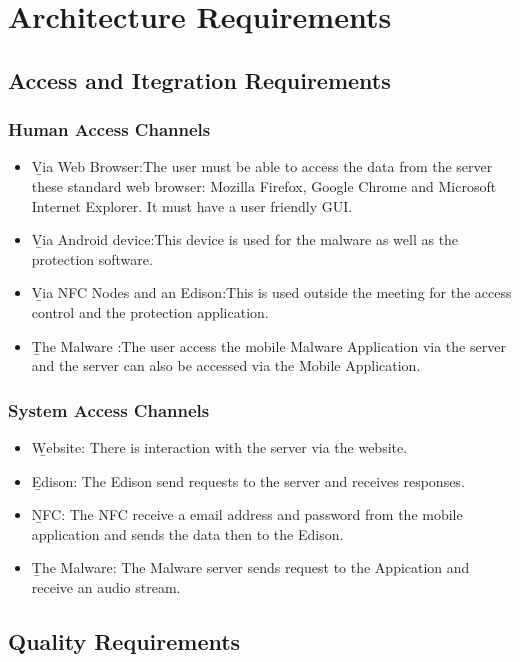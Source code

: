 \documentclass[a4paper,12pt,titlepage]{article}
\begin{document}
	
	
	\newpage
\tableofcontents
\newpage \section{Architecture Requirements}
\subsection{Access and Itegration Requirements}
\subsubsection{Human Access Channels}
 	\begin{itemize}
 		\item\b{Via Web Browser}:The user must be able to access the data from the server these standard web browser: Mozilla Firefox, Google Chrome and Microsoft Internet Explorer. It must have a user friendly GUI.
 		\item\b{Via Android device}:This device is used for the malware as well as the protection software.
 		\item\b{Via NFC Nodes and an Edison}:This is used outside the meeting for the access control and the protection application.
		\item\b{The Malware} :The user access the mobile Malware Application via the server and the server can also be accessed via the Mobile Application.
	\end{itemize}
\subsubsection{System Access Channels}
	\begin{itemize}
 		\item\b{Website}: There is interaction with the server via the website.
 		\item\b{Edison}: The Edison send requests to the server and receives responses.
 		\item\b{NFC}: The NFC receive  a email address and password from the mobile application and sends the data then to the Edison.
		\item\b{The Malware}: The Malware server sends request to the Appication and receive an audio stream. 
	\end{itemize}

\subsection{Quality Requirements}
\end{document}
